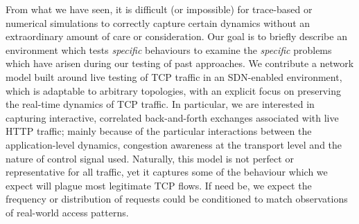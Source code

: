 \documentclass[conference, letterpaper, 10pt, times]{IEEEtran}
\begin{document}
From what we have seen, it is difficult (or impossible) for trace-based or numerical simulations to correctly capture certain dynamics without an extraordinary amount of care or consideration.
Our goal is to briefly describe an environment which tests \emph{specific} behaviours to examine the \emph{specific} problems which have arisen during our testing of past approaches.
We contribute a network model built around live testing of TCP traffic in an SDN-enabled environment, which is adaptable to arbitrary topologies, with an explicit focus on preserving the real-time dynamics of TCP traffic.
In particular, we are interested in capturing interactive, correlated back-and-forth exchanges associated with live HTTP traffic; mainly because of the particular interactions between the application-level dynamics, congestion awareness at the transport level and the nature of control signal used.
Naturally, this model is not perfect or representative for all traffic, yet it captures some of the behaviour which we expect will plague most legitimate TCP flows.
If need be, we expect the frequency or distribution of requests could be conditioned to match observations of real-world access patterns.



\end{document}
